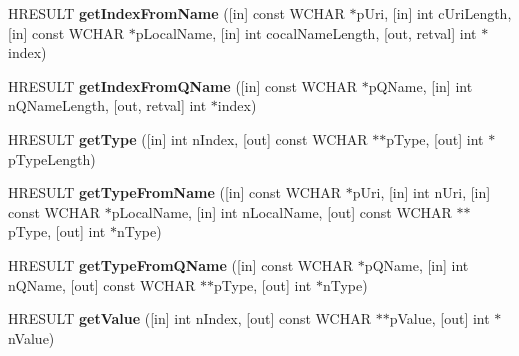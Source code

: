 \begin{DoxyCompactItemize}
H\+R\+E\+S\+U\+LT {\bfseries get\+Index\+From\+Name} (\mbox{[}in\mbox{]} const W\+C\+H\+AR $\ast$p\+Uri, \mbox{[}in\mbox{]} int c\+Uri\+Length, \mbox{[}in\mbox{]} const W\+C\+H\+AR $\ast$p\+Local\+Name, \mbox{[}in\mbox{]} int cocal\+Name\+Length, \mbox{[}out, retval\mbox{]} int $\ast$index)
\item 
\mbox{\label{interface_m_s_x_m_l2_1_1_i_s_a_x_attributes_aaf9151e07d686e433a4abc5d67925ed5}} 
H\+R\+E\+S\+U\+LT {\bfseries get\+Index\+From\+Q\+Name} (\mbox{[}in\mbox{]} const W\+C\+H\+AR $\ast$p\+Q\+Name, \mbox{[}in\mbox{]} int n\+Q\+Name\+Length, \mbox{[}out, retval\mbox{]} int $\ast$index)
\item 
\mbox{\label{interface_m_s_x_m_l2_1_1_i_s_a_x_attributes_ab02c608260cd88d7a248ff98911e0768}} 
H\+R\+E\+S\+U\+LT {\bfseries get\+Type} (\mbox{[}in\mbox{]} int n\+Index, \mbox{[}out\mbox{]} const W\+C\+H\+AR $\ast$$\ast$p\+Type, \mbox{[}out\mbox{]} int $\ast$p\+Type\+Length)
\item 
\mbox{\label{interface_m_s_x_m_l2_1_1_i_s_a_x_attributes_a93fbbcd83ba229651685b0148a5b1658}} 
H\+R\+E\+S\+U\+LT {\bfseries get\+Type\+From\+Name} (\mbox{[}in\mbox{]} const W\+C\+H\+AR $\ast$p\+Uri, \mbox{[}in\mbox{]} int n\+Uri, \mbox{[}in\mbox{]} const W\+C\+H\+AR $\ast$p\+Local\+Name, \mbox{[}in\mbox{]} int n\+Local\+Name, \mbox{[}out\mbox{]} const W\+C\+H\+AR $\ast$$\ast$p\+Type, \mbox{[}out\mbox{]} int $\ast$n\+Type)
\item 
\mbox{\label{interface_m_s_x_m_l2_1_1_i_s_a_x_attributes_a8eb22b7d4a92b6392a7d3c00afca99ab}} 
H\+R\+E\+S\+U\+LT {\bfseries get\+Type\+From\+Q\+Name} (\mbox{[}in\mbox{]} const W\+C\+H\+AR $\ast$p\+Q\+Name, \mbox{[}in\mbox{]} int n\+Q\+Name, \mbox{[}out\mbox{]} const W\+C\+H\+AR $\ast$$\ast$p\+Type, \mbox{[}out\mbox{]} int $\ast$n\+Type)
\item 
\mbox{\label{interface_m_s_x_m_l2_1_1_i_s_a_x_attributes_a55439906a3e0886871c1462558b16939}} 
H\+R\+E\+S\+U\+LT {\bfseries get\+Value} (\mbox{[}in\mbox{]} int n\+Index, \mbox{[}out\mbox{]} const W\+C\+H\+AR $\ast$$\ast$p\+Value, \mbox{[}out\mbox{]} int $\ast$n\+Value)
\item 

\end{DoxyCompactItemize}
